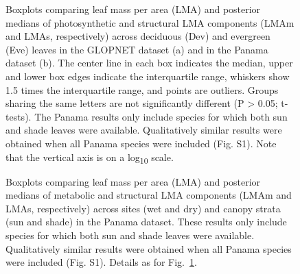 \documentclass[
  12pt,
  letterpaper,
  DIV=11,
  numbers=noendperiod]{scrartcl}
\begin{document}
\newpage

\begin{figure}


\caption{\label{fig-box_de}Boxplots comparing leaf mass per area (LMA)
and posterior medians of photosynthetic and structural LMA components
(LMAm and LMAs, respectively) across deciduous (Dev) and evergreen (Eve)
leaves in the GLOPNET dataset (a) and in the Panama dataset (b). The
center line in each box indicates the median, upper and lower box edges
indicate the interquartile range, whiskers show 1.5 times the
interquartile range, and points are outliers. Groups sharing the same
letters are not significantly different (P \textgreater{} 0.05;
t-tests). The Panama results only include species for which both sun and
shade leaves were available. Qualitatively similar results were obtained
when all Panama species were included (Fig. S1). Note that the vertical
axis is on a log\textsubscript{10} scale.}

\end{figure}%

\newpage

\begin{figure}


\caption{\label{fig-box_pa}Boxplots comparing leaf mass per area (LMA)
and posterior medians of metabolic and structural LMA components (LMAm
and LMAs, respectively) across sites (wet and dry) and canopy strata
(sun and shade) in the Panama dataset. These results only include
species for which both sun and shade leaves were available.
Qualitatively similar results were obtained when all Panama species were
included (Fig. S1). Details as for Fig.~\ref{fig-box_de}.}

\end{figure}%

\newpage
\end{document}
